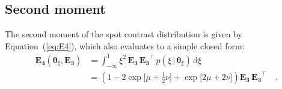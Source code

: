\documentclass[modern]{aastex62}
\begin{document}
\subsection{Second moment}
\label{sec:contrast-mom2}
The second moment of the spot contrast distribution is given by
Equation~(\ref{eq:E4}), which also evaluates to a simple closed form:
%
\begin{align}
    \mathbf{E_4}(\pmb{\theta}_\xi, \mathbf{E_3})
     & =
    \int_{-\infty}^1
    \xi^2 \,
    \mathbf{E_3} \,
    \mathbf{E_3}^\top \,
    p(\xi \, \big| \, \pmb{\theta}_{\xi}) \,
    \mathrm{d}\xi
    \nonumber
    \\
     & =
    \left(1 - 2\exp\bigg[ \mu + \frac{1}{2}\nu\bigg]
    + \exp\bigg[ 2\mu + 2\nu\bigg]\right)
    \mathbf{E_3} \,
    \mathbf{E_3}^\top
    \quad.
\end{align}




\end{document}
